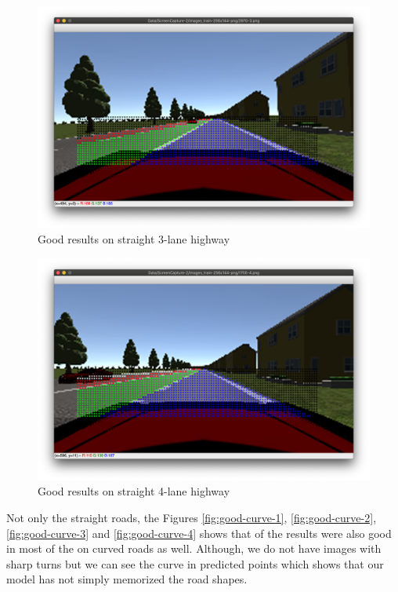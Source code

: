 \begin{figure}[H]
  \centering
  \includegraphics[scale=0.31]{images/Chapter5/lane3-straight-green.png}
  \caption{Good results on straight 3-lane highway}
  \label{fig:good-straight-3}
\end{figure}
\begin{figure}[H]
  \centering
  \includegraphics[scale=0.31]{images/Chapter5/lane4-straight-green.png}
  \caption{Good results on straight 4-lane highway}
  \label{fig:good-straight-4}
\end{figure}

\par
Not only the straight roads, the Figures \ref{fig:good-curve-1}, \ref{fig:good-curve-2}, \ref{fig:good-curve-3} and \ref{fig:good-curve-4} shows that of the results were also good in most of the on curved roads as well. Although, we do not have images with sharp turns but we can see the curve in predicted points which shows that our model has not simply memorized the road shapes.

